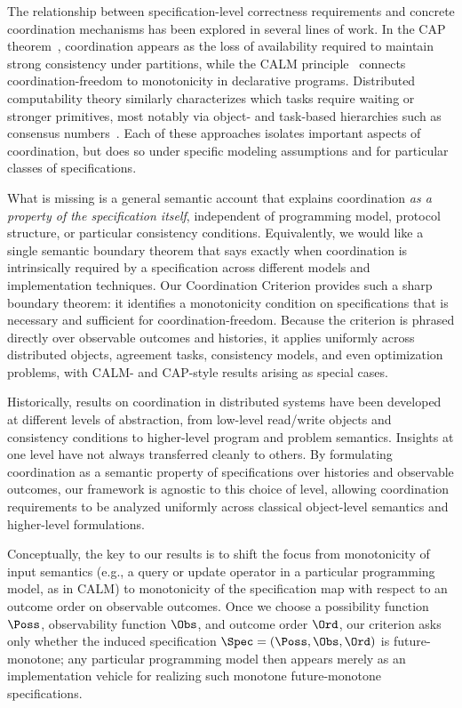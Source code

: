 The relationship between specification-level correctness requirements and
concrete coordination mechanisms has been explored in several lines of work.
In the CAP theorem~\cite{gilbert2002cap}, coordination appears as the loss of
availability required to maintain strong consistency under partitions, while
the CALM principle~\cite{hellerstein2010calm} connects coordination-freedom to
monotonicity in declarative programs.
Distributed computability theory similarly characterizes which tasks require
waiting or stronger primitives, most notably via object- and task-based
hierarchies such as consensus numbers~\cite{herlihy1991waitfree,herlihy1999topological}.
Each of these approaches isolates important aspects of coordination, but does so
under specific modeling assumptions and for particular classes of specifications.

What is missing is a general semantic account that explains coordination
\emph{as a property of the specification itself}, independent of programming
model, protocol structure, or particular consistency conditions.
Equivalently, we would like a single semantic boundary theorem that says
exactly when coordination is intrinsically required by a specification across
different models and implementation techniques.
Our Coordination Criterion provides such a sharp boundary theorem: it identifies a
monotonicity condition on specifications that is necessary and sufficient for
coordination-freedom. Because the criterion is phrased directly over observable
outcomes and histories, it applies uniformly across distributed objects,
agreement tasks, consistency models, and even optimization problems, with CALM-
and CAP-style results arising as special cases.

Historically, results on coordination in distributed systems have been developed
at different levels of abstraction, from low-level read/write objects and
consistency conditions to higher-level program and problem semantics.
Insights at one level have not always transferred cleanly to others.
By formulating coordination as a semantic property of specifications over
histories and observable outcomes, our framework is agnostic to
this choice of level, allowing coordination requirements to be analyzed
uniformly across classical object-level semantics and higher-level formulations.

Conceptually, the key to our results is to shift the focus from monotonicity
of input semantics (e.g., a query or update operator in a particular
programming model, as in CALM) to monotonicity of the specification map
with respect to an outcome order on observable outcomes.
Once we choose a possibility function $\Poss$, observability function $\Obs$, and
outcome order $\Ord$, our criterion asks only whether the induced specification
$\Spec = (\Poss, \Obs, \Ord)$ is future-monotone; any particular
programming model then
appears merely as an implementation vehicle for realizing such monotone
future-monotone specifications.

